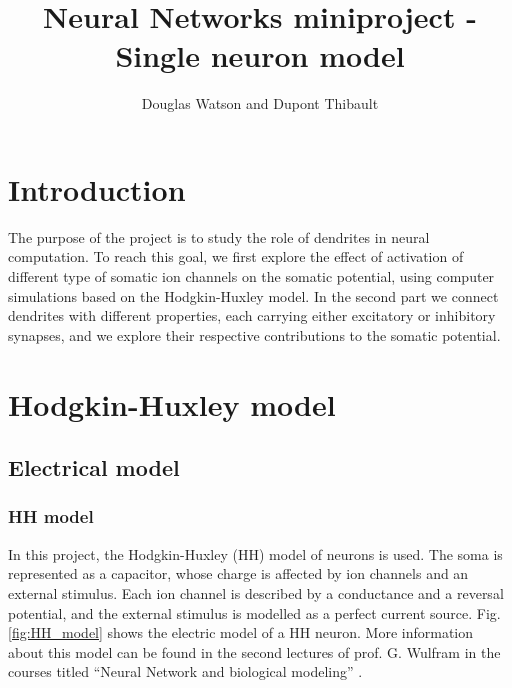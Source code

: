 \documentclass[a4paper, 10pt, conference]{ieeeconf}      %
\title{\LARGE \bf
Neural Networks miniproject - Single neuron model
}
\author{Douglas Watson and Dupont Thibault}
\begin{document}
\newcommand{\order}[1]{$\cdot 10^{#1}$}
\newcommand{\pvalue}[2]{p-value $< #1 \cdot 10^{#2}$}
\renewcommand{\thefigure}{\arabic{figure}}

\maketitle
\thispagestyle{fancyplain}




\setcounter{tocdepth}{10}

\section{Introduction}
The purpose of the project is to study the role of dendrites in neural computation. To reach this goal, we first explore the effect of activation of different type of somatic ion channels on the somatic potential, using computer simulations based on the Hodgkin-Huxley model. In the second part we connect dendrites with different properties, each carrying either excitatory or inhibitory synapses, and we explore their respective contributions to the somatic potential. \\

\section{Hodgkin-Huxley model}




\subsection{Electrical model}



\subsubsection*{HH model}

In this project, the Hodgkin-Huxley (HH) model of neurons is used. The soma is represented as a capacitor, whose charge is affected by ion channels and an external stimulus. Each ion channel is described by a conductance and a reversal potential, and the external stimulus is modelled as a perfect current source. Fig. \ref{fig:HH_model} shows the electric model of a HH neuron. More information about this model can be found in the second lectures of prof. G. Wulfram in the courses titled “Neural Network and biological modeling” \cite{course}.
\end{document}
